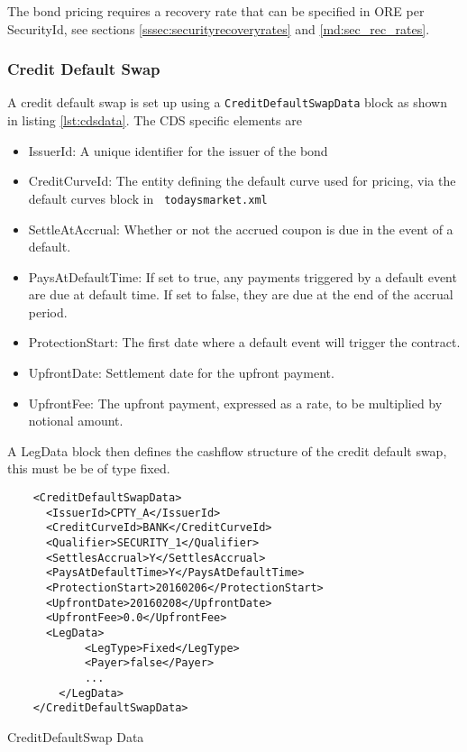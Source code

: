 The bond pricing requires a recovery rate that can be specified in ORE per SecurityId, see sections \ref{sssec:securityrecoveryrates} and \ref{md:sec_rec_rates}. 

\subsubsection{Credit Default Swap}

A credit default swap is set up using a {\tt CreditDefaultSwapData} block as shown in listing \ref{lst:cdsdata}. The CDS specific elements
are

\begin{itemize}
\item IssuerId: A unique identifier for the issuer of the bond
\item CreditCurveId: The entity defining the default curve used for pricing, via the default curves block in {\tt
    todaysmarket.xml}
\item SettleAtAccrual: Whether or not the accrued coupon is due in the event of a default.
\item PaysAtDefaultTime: If set to true, any payments triggered by a default event are due at default time. If set to false, they are due at the end of the accrual period.
\item ProtectionStart: The first date where a default event will trigger the contract.
\item UpfrontDate: Settlement date for the upfront payment.
\item UpfrontFee: The upfront payment, expressed as a rate, to be multiplied by notional amount.
\end{itemize}

A LegData block then defines the cashflow structure of the credit default swap, this must be be of type fixed.

\begin{listing}[H]
\begin{verbatim}
    <CreditDefaultSwapData>
      <IssuerId>CPTY_A</IssuerId>
      <CreditCurveId>BANK</CreditCurveId>
      <Qualifier>SECURITY_1</Qualifier>
      <SettlesAccrual>Y</SettlesAccrual>
      <PaysAtDefaultTime>Y</PaysAtDefaultTime>
      <ProtectionStart>20160206</ProtectionStart>
      <UpfrontDate>20160208</UpfrontDate>
      <UpfrontFee>0.0</UpfrontFee>
      <LegData>
            <LegType>Fixed</LegType>
            <Payer>false</Payer>
            ...
        </LegData>
    </CreditDefaultSwapData>
\end{verbatim}
\caption{CreditDefaultSwap Data}
\label{lst:cdsdata}
\end{listing}


